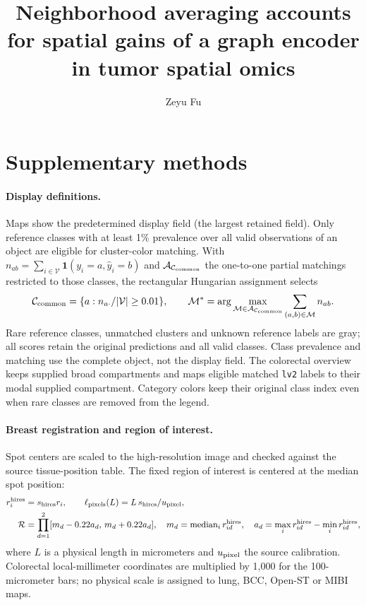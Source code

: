 \documentclass[11pt]{article}
\title{Neighborhood averaging accounts for spatial gains of a graph encoder in tumor spatial omics}
\author{Zeyu Fu}\date{}
\renewcommand{\thefigure}{S\arabic{figure}}
\begin{document}
\renewcommand{\thefigure}{S\arabic{figure}}
\raggedbottom\maketitle
\section*{Supplementary methods}
\paragraph{Display definitions.} Maps show the predetermined display field (the largest retained field). Only reference classes with at least 1\% prevalence over all valid observations of an object are eligible for cluster-color matching. With \(n_{ab}=\sum_{i\in\mathcal V}\mathbf1(y_i=a,\widehat y_i=b)\) and \(\mathcal A_{\mathcal C_{\rm common}}\) the one-to-one partial matchings restricted to those classes, the rectangular Hungarian assignment selects
\begin{equation}
\mathcal C_{\rm common}=\{a:n_{a\cdot}/|\mathcal V|\geq0.01\},\qquad
\mathcal M^*=\arg\max_{\mathcal M\in\mathcal A_{\mathcal C_{\rm common}}}\sum_{(a,b)\in\mathcal M}n_{ab}.\label{eq:display-match}
\end{equation}
Rare reference classes, unmatched clusters and unknown reference labels are gray; all scores retain the original predictions and all valid classes. Class prevalence and matching use the complete object, not the display field. The colorectal overview keeps supplied broad compartments and maps eligible matched \texttt{lv2} labels to their modal supplied compartment. Category colors keep their original class index even when rare classes are removed from the legend.

\paragraph{Breast registration and region of interest.} Spot centers are scaled to the high-resolution image and checked against the source tissue-position table. The fixed region of interest is centered at the median spot position:
\begin{equation}\begin{aligned}
r_i^{\rm hires}&=s_{\rm hires}r_i,\qquad
\ell_{\rm pixels}(L)=L\,s_{\rm hires}/u_{\rm pixel},\\
\mathcal R&=\prod_{d=1}^2[m_d-0.22a_d,\,m_d+0.22a_d],\quad
m_d=\operatorname{median}_i r_{id}^{\rm hires},\quad
a_d=\max_i r_{id}^{\rm hires}-\min_i r_{id}^{\rm hires},
\end{aligned}\label{eq:registration}\end{equation}
where \(L\) is a physical length in micrometers and \(u_{\rm pixel}\) the source calibration. Colorectal local-millimeter coordinates are multiplied by 1,000 for the 100-micrometer bars; no physical scale is assigned to lung, BCC, Open-ST or MIBI maps.
\end{document}
